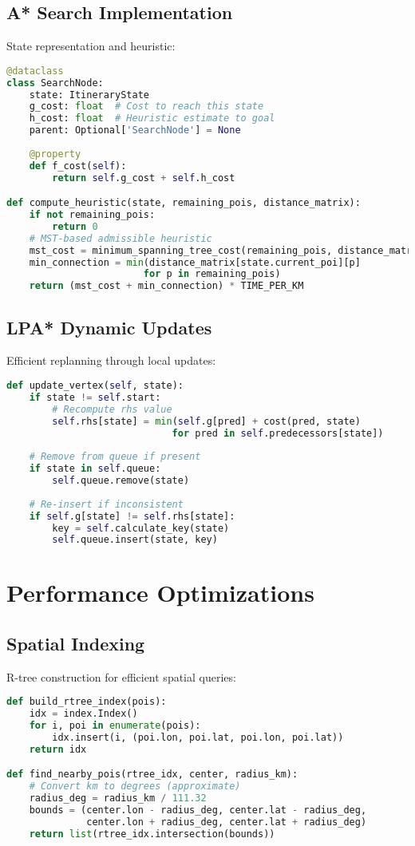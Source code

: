 \subsection{A* Search Implementation}
State representation and heuristic:
\begin{lstlisting}[language=Python]
@dataclass
class SearchNode:
    state: ItineraryState
    g_cost: float  # Cost to reach this state
    h_cost: float  # Heuristic estimate to goal
    parent: Optional['SearchNode'] = None
    
    @property
    def f_cost(self):
        return self.g_cost + self.h_cost

def compute_heuristic(state, remaining_pois, distance_matrix):
    if not remaining_pois:
        return 0
    # MST-based admissible heuristic
    mst_cost = minimum_spanning_tree_cost(remaining_pois, distance_matrix)
    min_connection = min(distance_matrix[state.current_poi][p] 
                        for p in remaining_pois)
    return (mst_cost + min_connection) * TIME_PER_KM
\end{lstlisting}

\subsection{LPA* Dynamic Updates}
Efficient replanning through local updates:
\begin{lstlisting}[language=Python]
def update_vertex(self, state):
    if state != self.start:
        # Recompute rhs value
        self.rhs[state] = min(self.g[pred] + cost(pred, state)
                             for pred in self.predecessors[state])
    
    # Remove from queue if present
    if state in self.queue:
        self.queue.remove(state)
    
    # Re-insert if inconsistent
    if self.g[state] != self.rhs[state]:
        key = self.calculate_key(state)
        self.queue.insert(state, key)
\end{lstlisting}

\section{Performance Optimizations}

\subsection{Spatial Indexing}
R-tree construction for efficient spatial queries:
\begin{lstlisting}[language=Python]
def build_rtree_index(pois):
    idx = index.Index()
    for i, poi in enumerate(pois):
        idx.insert(i, (poi.lon, poi.lat, poi.lon, poi.lat))
    return idx

def find_nearby_pois(rtree_idx, center, radius_km):
    # Convert km to degrees (approximate)
    radius_deg = radius_km / 111.32
    bounds = (center.lon - radius_deg, center.lat - radius_deg,
              center.lon + radius_deg, center.lat + radius_deg)
    return list(rtree_idx.intersection(bounds))
\end{lstlisting}


